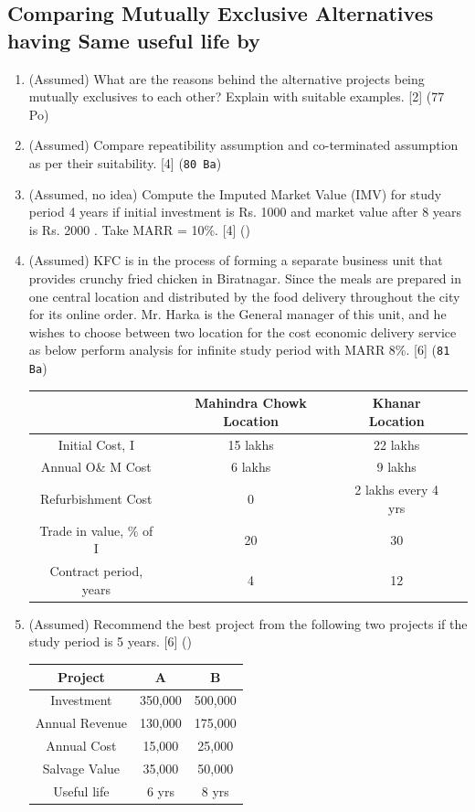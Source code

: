 \documentclass[12pt]{article}
\begin{document}
	\subsection{Comparing Mutually Exclusive Alternatives having Same useful life by}
	\begin{enumerate}[noitemsep, topsep=0pt]
		\item (Assumed) What are the reasons behind the alternative projects being mutually exclusives to each other? Explain with suitable examples. \hfill [2] (77 Po)
		\item (Assumed) Compare repeatibility assumption and co-terminated assumption as per their suitability. \hspace{14.4cm} [4] (\texttt{80 Ba})
		
		\item (Assumed, no idea) Compute the Imputed Market Value (IMV) for study period 4 years if initial investment is Rs. 1000 and market value after 8 years is Rs. 2000 . Take MARR = 10\%. \hfill [4] ()
		
		\item (Assumed) KFC is in the process of forming a separate business unit that provides crunchy fried chicken in Biratnagar. Since the meals are prepared in one central location and distributed by the food delivery throughout the city for its online order. Mr. Harka is the General manager of this unit, and he wishes to choose between two location for the cost economic delivery service as below perform analysis for infinite study period with MARR 8\%. \hfill [6] (\texttt{81 Ba})\\
		\begin{tabular}{|c|c|c|c|}
			\hline
			& Mahindra Chowk Location & Khanar Location \\ \hline
			Initial Cost, I & 15 lakhs & 22 lakhs \\ \hline
			Annual O\& M Cost & 6 lakhs & 9 lakhs \\ \hline
			Refurbishment Cost & 0 & 2 lakhs every 4 yrs \\ \hline
			Trade in value, \% of I & 20 & 30 \\ \hline
			Contract period, years & 4 & 12 \\ \hline
		\end{tabular}
		
		\item (Assumed) Recommend the best project from the following two projects if the study period is 5 years. \hfill [6] ()\\
		\begin{tabular}{|c|c|c|}
			\hline
			Project & A & B \\ \hline
			Investment & 350,000 & 500,000 \\ \hline
			Annual Revenue & 130,000 & 175,000 \\ \hline
			Annual Cost & 15,000 & 25,000 \\ \hline
			Salvage Value & 35,000 & 50,000 \\ \hline
			Useful life & 6 yrs & 8 yrs \\ \hline
		\end{tabular}
	\end{enumerate}
\end{document}
